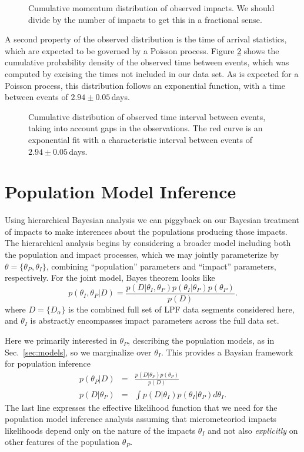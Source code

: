 \documentclass[preprint, trackchanges]{aastex61}
\begin{document}
\begin{figure}
\caption{Cumulative momentum distribution of observed impacts. We should divide by the number of impacts to get this in a fractional sense. \label{fig:CDF_P}}
\end{figure}

A second property of the observed distribution is the time of arrival statistics, which are expected to be governed by a Poisson process. Figure \ref{fig:CDF_rate} shows the cumulative probability density of the observed time between events, which was computed by excising the times not included in our data set. As is expected for a Poisson process, this distribution follows an exponential function, with a time between events of $2.94\pm0.05\,$days. 
\begin{figure}
\caption{Cumulative distribution of observed time interval between events, taking into account gaps in the observations. The red curve is an exponential fit with a characteristic interval between events of $2.94\pm0.05\,$days. \label{fig:CDF_rate}}
\end{figure}


\FloatBarrier
\section{Population Model Inference} \label{sec:model_inference}

Using hierarchical Bayesian analysis we can piggyback on our Bayesian treatment of impacts to make interences about the populations producing those impacts. The hierarchical analysis begins by considering a broader model including both the population and impact processes, which we may jointly parameterize by $\theta=\{\theta_P,\theta_I\}$, combining ``population'' parameters and ``impact'' parameters, respectively.  For the joint model, Bayes theorem looks like
\begin{equation}
  p(\theta_I,\theta_P|D)=\frac{p(D|\theta_I,\theta_P)p(\theta_I|\theta_P)p(\theta_P)}{p(D)}.
\end{equation}
where $D=\{D_\alpha\}$ is the combined full set of LPF data segments considered here, and $\theta_I$ is abstractly encompasses impact parameters across the full data set.

Here we primarily interested in $\theta_P$, describing the population models, as in Sec.~\ref{sec:models}, so we marginalize over $\theta_I$.  This provides a Baysian framework for population inference
\begin{eqnarray}
  p(\theta_P|D)&=&\frac{ p(D|\theta_P)p(\theta_P)}{p(D)}\label{eq:HierBayesThm}\\
  p(D|\theta_P)&=&\int p(D|\theta_I)p(\theta_I|\theta_P)d\theta_I\label{eq:metaLike}.
\end{eqnarray}
The last line expresses the effective likelihood function that we need for the population model inference analysis assuming that micrometeoriod impacts likelihoods depend only on the nature of the impacts $\theta_I$ and not also \textit{explicitly} on other features of the population $\theta_P$.
\end{document}
